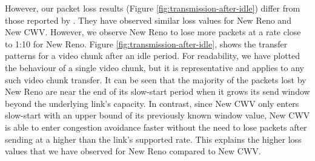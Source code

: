 \documentclass[10pt,sigconf]{acmart}
\begin{document}
However, our packet loss results (Figure \ref{fig:transmission-after-idle}) differ from those reported by \cite{Nazir-2014-performance-evaluation-congestion-window-validation-dash-newcwv}. They have observed similar loss values for New Reno and New CWV. However, we observe New Reno to lose more packets at a rate close to 1:10 for New Reno. Figure \ref{fig:transmission-after-idle}, shows the transfer patterns for a video chunk after an idle period. For readability, we have plotted the behaviour of a single video chunk, but it is representative and applies to any such video chunk transfer. It can be seen that the majority of the packets lost by New Reno are near the end of its slow-start period when it grows its send window beyond the underlying link's capacity. In contrast, since New CWV only enters slow-start with an upper bound of its previously known window value, New CWV is able to enter congestion avoidance faster without the need to lose packets after sending at a higher than the link's supported rate. This explains the higher loss values that we have observed for New Reno compared to New CWV.  
\end{document}
